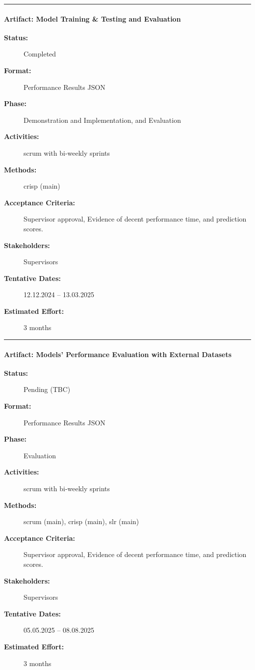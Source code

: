 \noindent\rule{13cm}{0.3pt}


\paragraph{Artifact: Model Training \& Testing and Evaluation}
\begin{description}
  \item[\textbf{Status:}] Completed
  \item[\textbf{Format:}] Performance Results JSON
  \item[\textbf{Phase:}] Demonstration and Implementation, and Evaluation
  \item[\textbf{Activities:}] \acrshort{scrum} with bi-weekly sprints
  \item[\textbf{Methods:}] \acrshort{crisp} (main)
  \item[\textbf{Acceptance Criteria:}] Supervisor approval, Evidence of decent performance time, and prediction scores.
  \item[\textbf{Stakeholders:}] Supervisors
  \item[\textbf{Tentative Dates:}] 12.12.2024 – 13.03.2025
  \item[\textbf{Estimated Effort:}] 3 months
\end{description}

\noindent\rule{13cm}{0.3pt}

\paragraph{Artifact: Models' Performance Evaluation with External Datasets}
\begin{description}
  \item[\textbf{Status:}] Pending (TBC)
  \item[\textbf{Format:}] Performance Results JSON
  \item[\textbf{Phase:}] Evaluation
  \item[\textbf{Activities:}] \acrshort{scrum} with bi-weekly sprints
  \item[\textbf{Methods:}] \acrshort{scrum} (main), \acrshort{crisp} (main), \acrshort{slr} (main)
  \item[\textbf{Acceptance Criteria:}] Supervisor approval, Evidence of decent performance time, and prediction scores.
  \item[\textbf{Stakeholders:}] Supervisors
  \item[\textbf{Tentative Dates:}] 05.05.2025 – 08.08.2025
  \item[\textbf{Estimated Effort:}] 3 months
\end{description}

